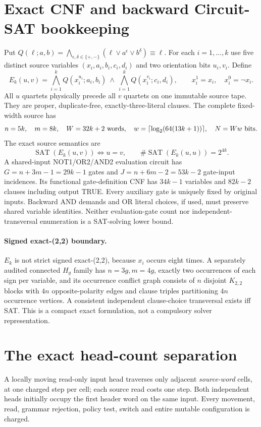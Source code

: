 \documentclass[11pt]{article}
\begin{document}
\section{Exact CNF and backward Circuit-SAT bookkeeping}
Put $Q(\ell;a,b)=\bigwedge_{\epsilon,\delta\in\{+,-\}}(\ell\vee a^\epsilon\vee b^\delta)\equiv\ell$. For each $i=1,\ldots,k$ use five distinct source variables $(x_i,a_i,b_i,c_i,d_i)$ and two orientation bits $u_i,v_i$. Define
\[
E_k(u,v)=\bigwedge_{i=1}^k Q(x_i^{u_i};a_i,b_i)\ \land\
\bigwedge_{i=1}^k Q(x_i^{v_i};c_i,d_i),\qquad
x_i^1=x_i,\quad x_i^0=\neg x_i .
\]
All $u$ quartets physically precede all $v$ quartets on one immutable source tape. They are proper, duplicate-free, exactly-three-literal clauses. The complete fixed-width source has
\[
n=5k,\quad m=8k,\quad W=32k+2\ {\rm words},\quad
w=\lceil\log_2(64(13k+1))\rceil,\quad N=Ww\ {\rm bits}.
\]
The exact source semantics are
\[
\boxed{\operatorname{SAT}(E_k(u,v))\iff u=v},
\qquad\#\operatorname{SAT}(E_k(u,u))=2^{4k}.
\]
A shared-input NOT1/OR2/AND2 evaluation circuit has $G=n+3m-1=29k-1$ gates and $J=n+6m-2=53k-2$ gate-input incidences. Its functional gate-definition CNF has $34k-1$ variables and $82k-2$ clauses including output TRUE. Every auxiliary gate is uniquely fixed by original inputs. Backward AND demands and OR literal choices, if used, must preserve shared variable identities. Neither evaluation-gate count nor independent-transversal enumeration is a SAT-solving lower bound.

\paragraph{Signed exact-(2,2) boundary.} $E_k$ is not strict signed exact-(2,2), because $x_i$ occurs eight times. A separately audited connected $H_g$ family has $n=3g,m=4g$, exactly two occurrences of each sign per variable, and its occurrence conflict graph consists of $n$ disjoint $K_{2,2}$ blocks with $4n$ opposite-polarity edges and clause triples partitioning $4n$ occurrence vertices. A consistent independent clause-choice transversal exists iff SAT. This is a compact exact formulation, not a compulsory solver representation.

\section{The exact head-count separation}
A locally moving read-only input head traverses only adjacent \emph{source-word} cells, at one charged step per cell; each source read costs one step. Both independent heads initially occupy the first header word on the same input. Every movement, read, grammar rejection, policy test, switch and entire mutable configuration is charged.
\end{document}
